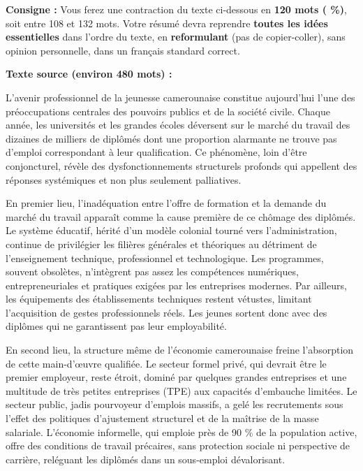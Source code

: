\documentclass[11pt]{article}
\begin{document}
\begin{exercice}
\textbf{Consigne :} Vous ferez une contraction du texte ci-dessous en \textbf{120 mots ( \%)}, soit entre 108 et 132 mots. Votre résumé devra reprendre \textbf{toutes les idées essentielles} dans l'ordre du texte, en \textbf{reformulant} (pas de copier-coller), sans opinion personnelle, dans un français standard correct.

\textbf{Texte source (environ 480 mots) :}

L'avenir professionnel de la jeunesse camerounaise constitue aujourd'hui l'une des préoccupations centrales des pouvoirs publics et de la société civile. Chaque année, les universités et les grandes écoles déversent sur le marché du travail des dizaines de milliers de diplômés dont une proportion alarmante ne trouve pas d'emploi correspondant à leur qualification. Ce phénomène, loin d'être conjoncturel, révèle des dysfonctionnements structurels profonds qui appellent des réponses systémiques et non plus seulement palliatives.

En premier lieu, l'inadéquation entre l'offre de formation et la demande du marché du travail apparaît comme la cause première de ce chômage des diplômés. Le système éducatif, hérité d'un modèle colonial tourné vers l'administration, continue de privilégier les filières générales et théoriques au détriment de l'enseignement technique, professionnel et technologique. Les programmes, souvent obsolètes, n'intègrent pas assez les compétences numériques, entrepreneuriales et pratiques exigées par les entreprises modernes. Par ailleurs, les équipements des établissements techniques restent vétustes, limitant l'acquisition de gestes professionnels réels. Les jeunes sortent donc avec des diplômes qui ne garantissent pas leur employabilité.

En second lieu, la structure même de l'économie camerounaise freine l'absorption de cette main-d'œuvre qualifiée. Le secteur formel privé, qui devrait être le premier employeur, reste étroit, dominé par quelques grandes entreprises et une multitude de très petites entreprises (TPE) aux capacités d'embauche limitées. Le secteur public, jadis pourvoyeur d'emplois massifs, a gelé les recrutements sous l'effet des politiques d'ajustement structurel et de la maîtrise de la masse salariale. L'économie informelle, qui emploie près de 90 \% de la population active, offre des conditions de travail précaires, sans protection sociale ni perspective de carrière, reléguant les diplômés dans un sous-emploi dévalorisant.


\end{exercice}
\end{document}
